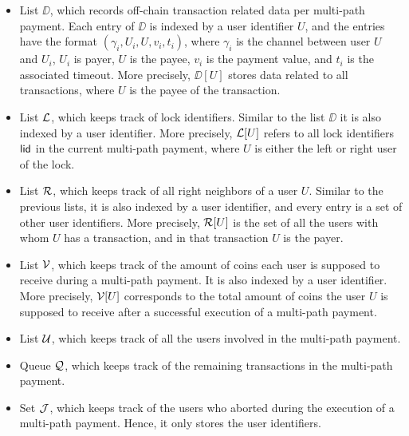 \begin{itemize}
	\item List $\DD$, which records off-chain transaction related data per multi-path 
	payment. Each entry of $\DD$ is indexed by a user identifier $U$, and the entries have the 
	format $(\gamma_i,U_i,U,v_i,t_i)$, where $\gamma_i$ is the channel between user $U$ and 
	$U_i$, $U_i$ is payer, $U$ is the payee, $v_i$ is the payment value, and $t_i$ is the 
	associated timeout. More precisely, $\DD[U]$ stores data related to all transactions, 
	where $U$ is the payee of the transaction. 
	\item List $\mathcal{L}$, which keeps track of lock identifiers. Similar to the list $\DD$ it is 
	also indexed by a user identifier. More precisely, $\mathcal{L}[U]$ refers to all lock identifiers 
	$\mathsf{lid}$ in the current multi-path payment, where $U$ is either the left or right user of 
	the lock.
	\item List $\mathcal{R}$, which keeps track of all right neighbors of a user $U$. Similar to the 
	previous lists, it is also indexed by a user identifier, and every entry is a set of other 
	user identifiers. More precisely, $\mathcal{R}[U]$ is the set of all the users with whom $U$ has a 
	transaction, and in that transaction $U$ is the payer.
	\item List $\mathcal{V}$, which keeps track of the amount of coins each user is supposed to 
	receive during a multi-path payment. It is also indexed by a user identifier. More precisely, 
	$\mathcal{V}[U]$ corresponds to the total amount of coins the user $U$ is supposed to receive after 
	a successful execution of a multi-path payment.
	\item List $\mathcal{U}$, which keeps track of all the users involved in the multi-path payment.
	\item Queue $\mathcal{Q}$, which keeps track of the remaining transactions in the multi-path payment.
	\item Set $\mathcal{J}$, which keeps track of the users who aborted during the execution of 
	a multi-path payment. Hence, it only stores the user identifiers.
\end{itemize}

